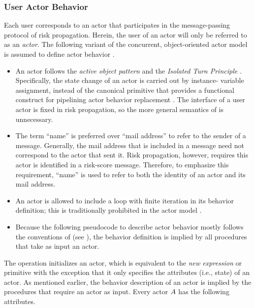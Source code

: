 \subsubsection{User Actor Behavior}\label{sec:behavior}

Each user corresponds to an actor that participates in the message-passing protocol of risk propagation. Herein, the user of an actor will only be referred to as an \emph{actor}. The following variant of the concurrent, object-oriented actor model is assumed to define actor behavior \cite{Agha1985, Agha1990}.
%
\begin{itemize}
	\item An actor follows the \emph{active object pattern} \cite{Lavender1996, Koster2016} and the \emph{Isolated Turn Principle} \cite{Koster2016}. Specifically, the state change of an actor is carried out by instance- variable assignment, instead of the canonical \cBecome{} primitive that provides a functional construct for pipelining actor behavior replacement \cite{AghaThesis1985, Agha1985, Agha1990}. The interface of a user actor is fixed in risk propagation, so the more general semantics of \cBecome{} is unnecessary.
	\item The term ``name'' \cite{Hewitt1977, AghaThesis1985} is preferred over ``mail address'' \cite{AghaThesis1985, Agha1985, Agha1990} to refer to the sender of a message. Generally, the mail address that is included in a message need not correspond to the actor that sent it. Risk propagation, however, requires this actor is identified in a risk-score message. Therefore, to emphasize this requirement, ``name'' is used to refer to both the identity of an actor and its mail address.
	\item An actor is allowed to include a loop with finite iteration in its behavior definition; this is traditionally prohibited in the actor model \cite{AghaThesis1985, Agha1990}.
	\item Because the following pseudocode to describe actor behavior mostly follows the conventions of \cite{Cormen2022} (see ), the behavior definition is implied by all procedures that take as input an actor.
\end{itemize}
%
The \cCreateActor{} operation initializes an actor, which is equivalent to the \emph{new expression} \cite{AghaThesis1985} or \cCreate{} primitive \cite{Agha1985, Agha1990} with the exception that it only specifies the attributes (i.e., state) of an actor. As mentioned earlier, the behavior description of an actor is implied by the procedures that require an actor as input. Every actor $A$ has the following attributes.

